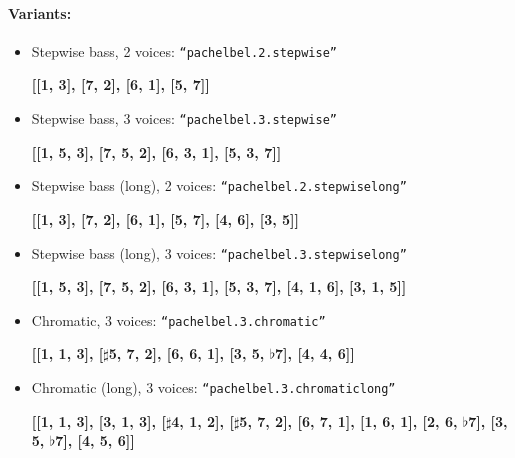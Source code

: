 \documentclass[11pt, openany]{article}
\begin{document}
\paragraph{Variants:}
\begin{itemize}
\item Stepwise bass, 2 voices: \texttt{“pachelbel.2.stepwise”}
	\begin{center}
	\textbf{[[1, 3], [7, 2], [6, 1], [5, 7]]}
	\end{center}
\item Stepwise bass, 3 voices: \texttt{“pachelbel.3.stepwise”}
	\begin{center}
	\textbf{[[1, 5, 3], [7, 5, 2], [6, 3, 1], [5, 3, 7]]}
	\end{center}
\item Stepwise bass (long), 2 voices: \texttt{“pachelbel.2.stepwiselong”}
	\begin{center}
	\textbf{[[1, 3], [7, 2], [6, 1], [5, 7], [4, 6], [3, 5]]}
	\end{center}
\item Stepwise bass (long), 3 voices: \texttt{“pachelbel.3.stepwiselong”}
	\begin{center}
	\textbf{[[1, 5, 3], [7, 5, 2], [6, 3, 1], [5, 3, 7], [4, 1, 6], [3, 1, 5]]}
	\end{center}
\item Chromatic, 3 voices: \texttt{“pachelbel.3.chromatic”}
	\begin{center}
	\textbf{[[1, 1, 3], [$\sharp$5, 7, 2], [6, 6, 1], [3, 5, $\flat$7], [4, 4, 6]]}
	\end{center}
\item Chromatic (long), 3 voices: \texttt{“pachelbel.3.chromaticlong”}
	\begin{center}
	\textbf{[[1, 1, 3], [3, 1, 3], [$\sharp$4, 1, 2], [$\sharp$5, 7, 2], [6, 7, 1], [1, 6, 1], [2, 6, $\flat$7], [3, 5, $\flat$7], [4, 5, 6]]}
	\end{center}
\end{itemize}
\end{document}
